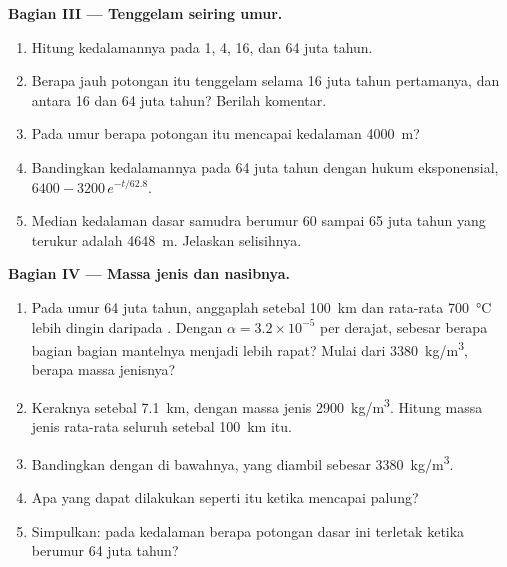 \begin{problem}
\medskip
\noindent\textbf{Bagian III --- Tenggelam seiring umur.}
\begin{enumerate}[resume]
  \item Hitung kedalamannya pada 1, 4, 16, dan 64 juta tahun.
  \item Berapa jauh potongan itu tenggelam selama 16 juta tahun pertamanya, dan
        antara 16 dan 64 juta tahun? Berilah komentar.
  \item Pada umur berapa potongan itu mencapai kedalaman \qty{4000}{m}?
  \item Bandingkan kedalamannya pada 64 juta tahun dengan hukum eksponensial,
        $6400 - 3200\,e^{-t/62.8}$.
  \item Median kedalaman dasar samudra berumur 60 sampai 65 juta tahun yang
        terukur adalah \qty{4648}{m}. Jelaskan selisihnya.
\end{enumerate}

\medskip
\noindent\textbf{Bagian IV --- Massa jenis dan nasibnya.}
\begin{enumerate}[resume]
  \item Pada umur 64 juta tahun, anggaplah  setebal \qty{100}{km}
        dan rata-rata \qty{700}{\celsius} lebih dingin daripada .
        Dengan $\alpha = 3.2 \times 10^{-5}$ per derajat, sebesar berapa bagian
        bagian mantelnya menjadi lebih rapat? Mulai dari \qty{3380}{kg/m^3},
        berapa massa jenisnya?
  \item Keraknya setebal \qty{7.1}{km}, dengan massa jenis
        \qty{2900}{kg/m^3}. Hitung massa jenis rata-rata seluruh 
        setebal \qty{100}{km} itu.
  \item Bandingkan dengan  di bawahnya, yang diambil sebesar
        \qty{3380}{kg/m^3}.
  \item Apa yang dapat dilakukan  seperti itu ketika mencapai palung?
  \item Simpulkan: pada kedalaman berapa potongan dasar ini terletak ketika
        berumur 64 juta tahun?
\end{enumerate}
\end{problem}
